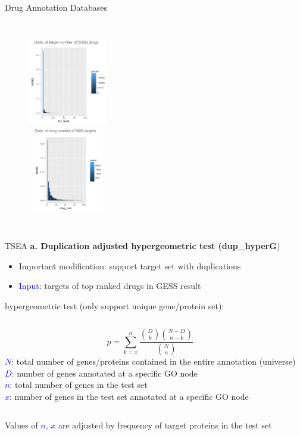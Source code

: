 \documentclass[10pt]{beamer}
\begin{document}
\begin{frame}{Drug Annotation Databases}
\begin{columns}[T,onlytextwidth]
    \vspace{-0.6cm}
      \begin{figure}
        \includegraphics[width=3.5cm, height=3.8cm]{demo/images/distri1.png} \\
        \includegraphics[width=3.5cm, height=3.8cm]{demo/images/distri2.png}
      \end{figure}
  \end{columns}
\end{frame}
\begin{frame}{TSEA}
\vspace{-0.8cm}
\alert{\textbf{a. Duplication adjusted hypergeometric test (dup\_hyperG})}
\begin{itemize}
    \item \alert{Important modification:} support target set with duplications
    \item \textcolor{blue}{Input:} targets of top ranked drugs in GESS result
\end{itemize}
hypergeometric test (only support unique gene/protein set):\\
\vspace{0.5cm}
\begin{columns}
        \begin{equation}
           \displaystyle p=\sum_{k=x}^{n}\frac {{D \choose k}{{N-D} \choose {n-k}}}{{N \choose n}}
        \end{equation}
      \scriptsize
      \textcolor{blue}{$N$}: total number of genes/proteins contained in the entire annotation (universe) \\
      \textcolor{blue}{$D$}:  number of genes annotated at a specific GO node \\
      \textcolor{blue}{$n$}: total number
of genes in the test set \\
      \textcolor{blue}{$x$}: number of genes in the test set annotated at a specific GO node
\end{columns}
\vspace{0.4cm}
Values of \textcolor{blue}{$n$}, \textcolor{blue}{$x$} are adjusted by frequency of target proteins in the test set
\end{frame}
\end{document}
